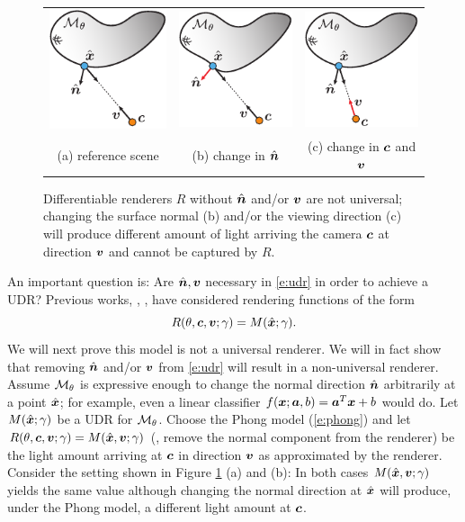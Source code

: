 \documentclass[runningheads]{llncs}
\begin{document}
\begin{figure}[t]
    \centering
    \begingroup
\setlength{\tabcolsep}{15pt} %
\renewcommand{\arraystretch}{1.5} %
    \begin{tabular}{c|c|c}
    \includegraphics[width=0.2\columnwidth]{not_udr_a.pdf}&  
    \includegraphics[width=0.2\columnwidth]{not_udr_b.pdf}&    \includegraphics[width=0.2\columnwidth]{not_udr_c.pdf}\\
     (a) reference scene & (b) change in ${\hat{\bm{n}}}$ & (c) change in ${\bm{c}}$ and ${\bm{v}}$  
\end{tabular}
\endgroup
    \caption{Differentiable renderers $R$ without ${\hat{\bm{n}}}$ and/or ${\bm{v}}$ are not universal; changing the surface normal (b) and/or the viewing direction (c) will produce different amount of light arriving the camera ${\bm{c}}$ at direction ${\bm{v}}$ and cannot be captured by $R$.}
    \label{fig:udr_no}
\end{figure}


An important question is: Are ${\hat{\bm{n}}},{\bm{v}}$ necessary in \eqref{e:udr} in order to achieve a UDR? Previous works, \eg, \cite{niemeyer2019differentiable}, have considered rendering functions of the form 
\begin{equation}\label{e:udr_no_n_no_v}
    R(\theta,{\bm{c}},{\bm{v}};\gamma)=M({\hat{\bm{x}}};\gamma).
\end{equation}
We will next prove this model is not a universal renderer. We will in fact show that removing ${\hat{\bm{n}}}$ and/or ${\bm{v}}$ from \eqref{e:udr} will result in a non-universal renderer. Assume ${\mathcal{M}}_\theta$ is expressive enough to change the normal direction ${\hat{\bm{n}}}$ arbitrarily at a point ${\hat{\bm{x}}}$; for example, even a linear classifier $f({\bm{x}};{\bm{a}},b)={\bm{a}}^T {\bm{x}}+b$ would do. Let $M({\hat{\bm{x}}};\gamma)$ be a UDR for ${\mathcal{M}}_\theta$. Choose the Phong model (\eqref{e:phong}) and let $R(\theta,{\bm{c}},{\bm{v}};\gamma)=M({\hat{\bm{x}}},{\bm{v}};\gamma)$ (\ie, remove the normal component from the renderer) be the light amount arriving at ${\bm{c}}$ in direction ${\bm{v}}$ as approximated by the renderer. Consider the setting shown in Figure \ref{fig:udr_no} (a) and (b): In both cases $M({\hat{\bm{x}}},{\bm{v}};\gamma)$ yields the same value although changing the normal direction at ${\hat{\bm{x}}}$ will produce, under the Phong model, a different light amount at ${\bm{c}}$. 
\end{document}
